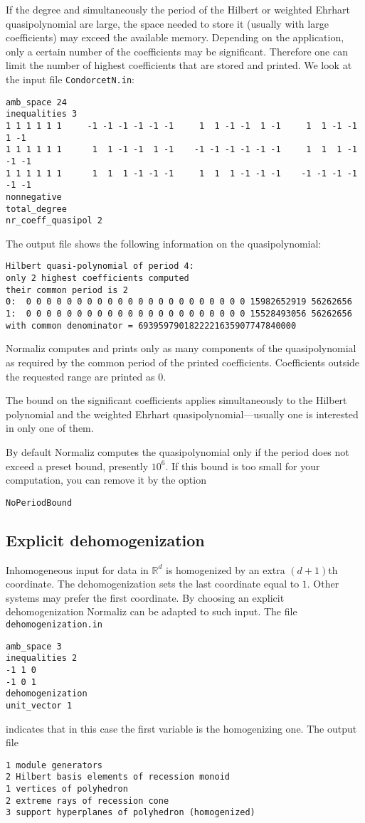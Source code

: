 \documentclass[12pt,a4paper]{scrartcl}
\theoremstyle{definition}
\def\RR{{\mathbb R}}
\begin{document}
{If the degree and simultaneously the period of the Hilbert or weighted Ehrhart quasipolynomial are large, the space needed to store it (usually with large coefficients) may exceed the available memory. Depending on the application, only a certain number of the coefficients may be significant. Therefore one can limit the number of highest coefficients that are stored and printed. We look at the input file \texttt{CondorcetN.in}:
\begin{Verbatim}
amb_space 24
inequalities 3
1 1 1 1 1 1     -1 -1 -1 -1 -1 -1     1  1 -1 -1  1 -1     1  1 -1 -1  1 -1
1 1 1 1 1 1      1  1 -1 -1  1 -1    -1 -1 -1 -1 -1 -1     1  1  1 -1 -1 -1
1 1 1 1 1 1      1  1  1 -1 -1 -1     1  1  1 -1 -1 -1    -1 -1 -1 -1 -1 -1
nonnegative
total_degree
nr_coeff_quasipol 2
\end{Verbatim}

The output file shows the following information on the quasipolynomial:
\begin{Verbatim}
Hilbert quasi-polynomial of period 4:
only 2 highest coefficients computed
their common period is 2
0:  0 0 0 0 0 0 0 0 0 0 0 0 0 0 0 0 0 0 0 0 0 0 15982652919 56262656
1:  0 0 0 0 0 0 0 0 0 0 0 0 0 0 0 0 0 0 0 0 0 0 15528493056 56262656
with common denominator = 6939597901822221635907747840000
\end{Verbatim}
Normaliz computes and prints only as many components of the quasipolynomial as required by the common period of the printed coefficients. Coefficients outside the requested range are printed as $0$.

The bound on the significant coefficients applies simultaneously to the Hilbert polynomial and the weighted Ehrhart quasipolynomial---usually one is interested in only one of them.

By default Normaliz computes the quasipolynomial only if the period does not exceed a preset bound, presently $10^6$. If this bound is too small for your computation, you can remove it by the option
\begin{Verbatim}
NoPeriodBound
\end{Verbatim}



\subsection{Explicit dehomogenization}\label{dehom_ex}
Inhomogeneous input for data in $\RR^{d}$ is homogenized by an extra $(d+1)$th coordinate. The dehomogenization sets the last coordinate equal to $1$. Other systems may prefer the first coordinate. By choosing an explicit dehomogenization Normaliz can be adapted to such input. The file \verb|dehomogenization.in|
\begin{Verbatim}
amb_space 3
inequalities 2
-1 1 0
-1 0 1
dehomogenization
unit_vector 1
\end{Verbatim}
indicates that in this case the first variable is the homogenizing one. The output file
\begin{Verbatim}
1 module generators
2 Hilbert basis elements of recession monoid
1 vertices of polyhedron
2 extreme rays of recession cone
3 support hyperplanes of polyhedron (homogenized)


\end{Verbatim}}
\end{document}
